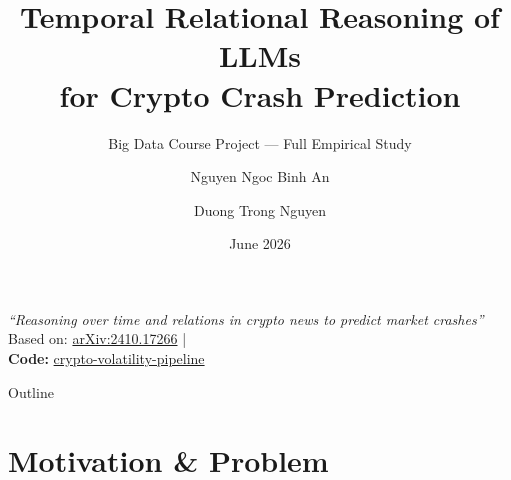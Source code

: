 \documentclass[10pt,aspectratio=169]{beamer}
\title{\textbf{Temporal Relational Reasoning of LLMs \\ for Crypto Crash Prediction}}
\subtitle{Big Data Course Project — Full Empirical Study}
\author{Nguyen Ngoc Binh An \and Duong Trong Nguyen}
\institute{University of Science, VNU-UET}
\date{June 2026}
\begin{document}
\begin{frame}[plain]
  \maketitle
  \begin{center}
    \vspace{0.3cm}
    \small \textit{``Reasoning over time and relations in crypto news to predict market crashes''} \\
    \vspace{0.2cm}
    \footnotesize Based on: \href{https://arxiv.org/abs/2410.17266}{arXiv:2410.17266} \quad | \quad \\
    \textbf{Code:} \href{https://github.com/nduongtrong/crypto-volatility-pipeline}{crypto-volatility-pipeline}
  \end{center}
\end{frame}

\begin{frame}{Outline}
  \tableofcontents
\end{frame}

\section{Motivation \& Problem}
\end{document}
